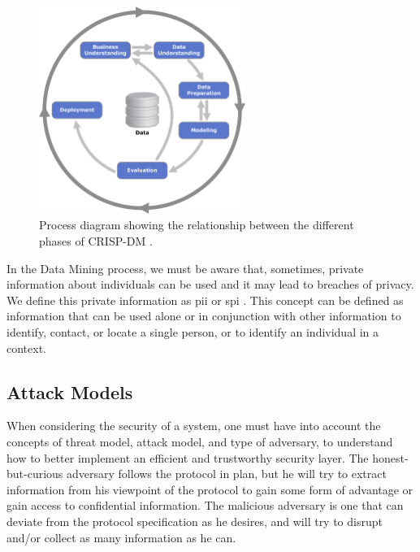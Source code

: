 \begin{figure}[!ht]
  \centering
  \includegraphics[width=0.60\textwidth]{images/CRISP-DM_Process_Diagram.png}
  \caption{Process diagram showing the relationship between the different phases of CRISP-DM \cite{wirth2000crisp}.}
  \label{fig:crisp-dm}
\end{figure}



In the Data Mining process, we must be aware that, sometimes, private information about individuals can be used and it may lead to breaches of privacy. We define this private information as \ac{pii} or \ac{spi} \cite{schwartz2011pii}. This concept can be defined as information that can be used alone or in conjunction with other information to identify, contact, or locate a single person, or to identify an individual in a context.



\subsection{Attack Models}
\label{ssec:AttackModels}

When considering the security of a system, one must have into account the concepts of threat model, attack model, and type of adversary, to understand how to better implement an efficient and trustworthy security layer. The honest-but-curious adversary follows the protocol in plan, but he will try to extract information from his viewpoint of the protocol to gain some form of advantage or gain access to confidential information.
The malicious adversary is one that can deviate from the protocol specification as he desires, and will try to disrupt and/or collect as many information as he can.

